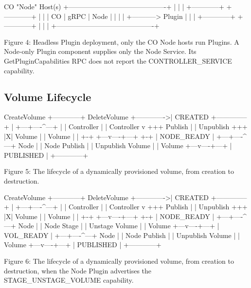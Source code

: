 \documentclass[12pt]{article}
\begin{document}
\begin{bashcode}
                            CO "Node" Host(s)
+-------------------------------------------+
|                                           |
|  +------------+           +------------+  |
|  |     CO     |   gRPC    |    Node    |  |
|  |            +----------->   Plugin   |  |
|  +------------+           +------------+  |
|                                           |
+-------------------------------------------+

Figure 4: Headless Plugin deployment, only the CO Node hosts run
Plugins. A Node-only Plugin component supplies only the Node Service.
Its GetPluginCapabilities RPC does not report the CONTROLLER_SERVICE
capability.
\end{bashcode}

\subsection{Volume Lifecycle}

\begin{bashcode}
   CreateVolume +------------+ DeleteVolume
 +------------->|  CREATED   +--------------+
 |              +---+----^---+              |
 |       Controller |    | Controller       v
+++         Publish |    | Unpublish       +++
|X|          Volume |    | Volume          | |
+-+             +---v----+---+             +-+
                | NODE_READY |
                +---+----^---+
               Node |    | Node
            Publish |    | Unpublish
             Volume |    | Volume
                +---v----+---+
                | PUBLISHED  |
                +------------+

Figure 5: The lifecycle of a dynamically provisioned volume, from
creation to destruction.
\end{bashcode}

\begin{bashcode}
   CreateVolume +------------+ DeleteVolume
 +------------->|  CREATED   +--------------+
 |              +---+----^---+              |
 |       Controller |    | Controller       v
+++         Publish |    | Unpublish       +++
|X|          Volume |    | Volume          | |
+-+             +---v----+---+             +-+
                | NODE_READY |
                +---+----^---+
               Node |    | Node
              Stage |    | Unstage
             Volume |    | Volume
                +---v----+---+
                |  VOL_READY |
                +---+----^---+
               Node |    | Node
            Publish |    | Unpublish
             Volume |    | Volume
                +---v----+---+
                | PUBLISHED  |
                +------------+

Figure 6: The lifecycle of a dynamically provisioned volume, from
creation to destruction, when the Node Plugin advertises the
STAGE_UNSTAGE_VOLUME capability.
\end{bashcode}
\end{document}
